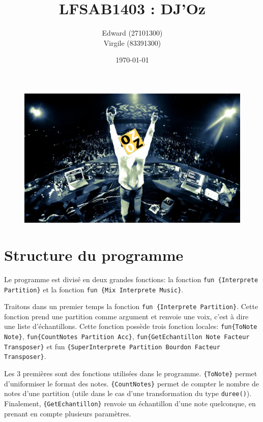 \documentclass[a4paper,12pt,oneside ]{article}
\title{LFSAB1403 : DJ'Oz}
\author{Edward \bsc{Nicol} (27101300) \\ Virgile \bsc{Goyens}(83391300)}
\date{\today}
\begin{document}
\maketitle

\begin{figure}[h]
\begin{center}
	\includegraphics[scale=0.3]{DJOZ}
\end{center}
\end{figure}

\newpage
\section{Structure du programme}
	Le programme est divisé en deux grandes fonctions: la fonction \texttt{fun \{Interprete Partition\}} et la fonction \texttt{fun \{Mix Interprete Music\}}.
	
	Traitons dans un premier temps la fonction \texttt{fun \{Interprete Partition\}}. Cette fonction prend une partition comme argument et renvoie une voix, c'est à dire une liste d'échantillons. Cette fonction possède trois fonction locales: \texttt{fun\{ToNote Note\}}, \texttt{fun\{CountNotes Partition Acc\}}, \texttt{fun\{GetEchantillon Note Facteur Transposer\}} et fun \texttt{\{SuperInterprete Partition Bourdon Facteur Transposer\}}.
	
	Les 3 premières sont des fonctions utilisées dans le programme. \texttt{\{ToNote\}} permet d'uniformiser le format des notes. \texttt{\{CountNotes\}} permet de compter le nombre de notes d'une partition (utile dans le cas d'une transformation du type \texttt{duree()}). Finalement, \texttt{\{GetEchantillon\}} renvoie un échantillon d'une note quelconque, en prenant en compte plusieurs paramètres.
	
\end{document}
